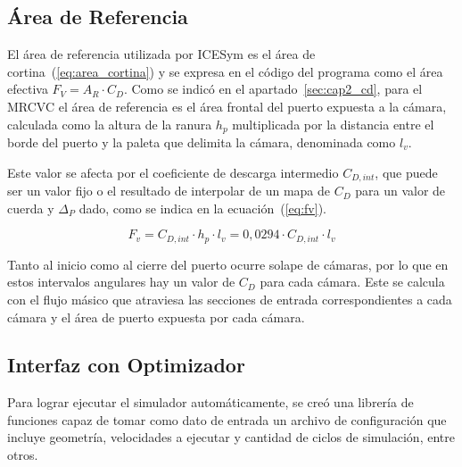 
\subsection{Área de Referencia}
%
El área de referencia utilizada por ICESym es el área de
cortina~(\ref{eq:area_cortina}) y se expresa en el código del programa como el
área efectiva $F_{V}=A_{R}\cdot C_{D}$.
%
Como se indicó en el apartado~\ref{sec:cap2_cd}, para el  MRCVC el área de
referencia es el área frontal del puerto expuesta a la cámara, calculada como la
altura de la ranura $h_{p}$ multiplicada por la distancia entre el borde del
puerto y la paleta que delimita la cámara, denominada como $l_{v}$.

%
%
Este valor se afecta por el coeficiente de descarga intermedio $C_{D,int}$, que
puede ser un valor fijo o el resultado de interpolar de un mapa de $C_D$ para un
valor de cuerda y $\Delta_P$ dado, como se indica en la ecuación~(\ref{eq:fv}).

\begin{equation}\label{eq:fv}
    F_v = C_{D,int}\cdot h_{p}\cdot l_{v} = 0,0294\cdot C_{D,int}\cdot l_{v}
\end{equation}


Tanto al inicio como al cierre del puerto ocurre solape de cámaras, por lo que
en estos intervalos angulares hay un valor de $C_D$ para cada cámara.
%
Este se calcula con el flujo másico que atraviesa las secciones de entrada
correspondientes a cada cámara y el área de puerto expuesta por cada cámara.

\subsection{Interfaz con Optimizador}
%
Para lograr ejecutar el simulador automáticamente, se creó una librería de
funciones capaz de tomar como dato de entrada un archivo de configuración que
incluye geometría, velocidades a ejecutar y cantidad de ciclos de simulación,
entre otros.


